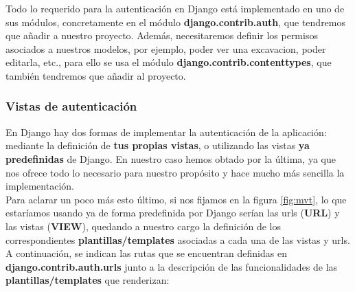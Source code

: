 Todo lo requerido para la autenticación en Django está implementado en uno de sus módulos,
concretamente en el módulo \textbf{django.contrib.auth}, que tendremos que añadir a
nuestro proyecto. Además, necesitaremos definir los permisos asociados a nuestros modelos,
por ejemplo, poder ver una excavacion, poder editarla, etc., para ello se usa el módulo
\textbf{django.contrib.contenttypes}, que también tendremos que añadir al proyecto.

\subsubsection{Vistas de autenticación}
En Django hay dos formas de implementar la autenticación de la aplicación: mediante la
definición de \textbf{tus propias vistas}, o utilizando las vistas \textbf{ya predefinidas}
de Django. En nuestro caso hemos obtado por la última, ya que nos ofrece todo lo necesario
para nuestro propósito y hace mucho más sencilla la implementación.\\

Para aclarar un poco más esto último, si nos fijamos en la figura \ref{fig:mvt}, lo que
estaríamos usando ya de forma predefinida por Django serían las urls (\textbf{URL}) y las
vistas (\textbf{VIEW}), quedando a nuestro cargo la definición de los correspondientes
\textbf{plantillas/templates} asociadas a cada una de las vistas y urls.\\

A continuación, se indican las rutas que se encuentran definidas en
\textbf{django.contrib.auth.urls} junto a la descripción de las funcionalidades de las
\textbf{plantillas/templates} que renderizan:

